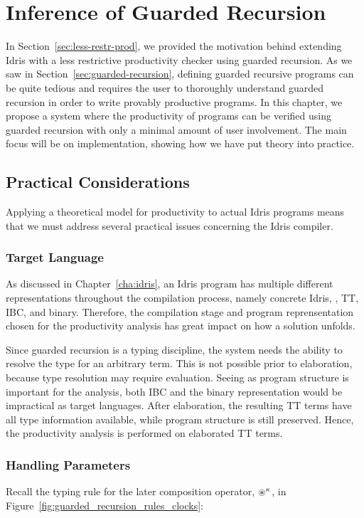 \chapter{Inference of Guarded Recursion}
\label{cha:infer-guard-recurs}
In Section~\ref{sec:less-restr-prod}, we provided the motivation behind
extending Idris with a less restrictive productivity checker using guarded
recursion. As we saw in Section~\ref{sec:guarded-recursion}, defining guarded
recursive programs can be quite tedious and requires the user to thoroughly
understand guarded recursion in order to write provably productive programs. In
this chapter, we propose a system where the productivity of programs can be
verified using guarded recursion with only a minimal amount of user
involvement. The main focus will be on implementation, showing how we have put theory into practice.

\section{Practical Considerations}
Applying a theoretical model for productivity to actual Idris programs means
that we must address several practical issues concerning the Idris compiler.

\subsection{Target Language}
As discussed in Chapter~\ref{cha:idris}, an Idris program has multiple different
representations throughout the compilation process, namely concrete Idris,
\IdrisM{}, TT, IBC, and binary. Therefore, the compilation
stage and program reprensentation chosen for the productivity analysis has great
impact on how a solution unfolds.

Since guarded recursion is a typing discipline, the system needs the ability to
resolve the type for an arbitrary term. This is not possible prior to
elaboration, because type resolution may require evaluation. Seeing as program
structure is important for the analysis, both IBC and the binary representation
would be impractical as target languages. After elaboration, the resulting TT
terms have all type information available, while program structure is still
preserved. Hence, the productivity analysis is performed on elaborated TT terms.

\subsection{Handling Parameters} %
\label{sec:handling-parameters}
Recall the typing rule for the later composition operator, $\circledast^\kappa$, in
Figure~\ref{fig:guarded_recursion_rules_clocks}:

